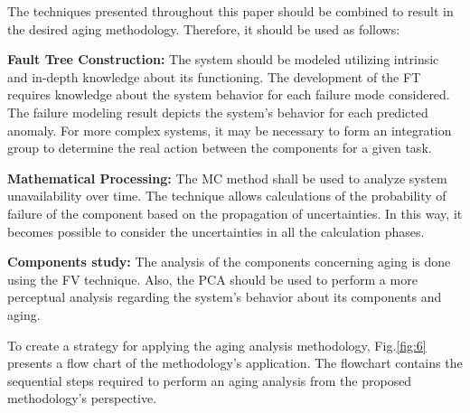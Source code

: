 \documentclass{ws-m3as}
\begin{document}
The techniques presented throughout this paper should be combined to result in the desired aging methodology. Therefore, it should be used as follows:

\begin{romanlist}[(ii)]
	\item \textbf{Fault Tree Construction:}
	The system should be modeled utilizing intrinsic and in-depth knowledge about its functioning. The development of the FT requires knowledge about the system behavior for each failure mode considered. The failure modeling result depicts the system's behavior for each predicted anomaly. For more complex systems, it may be necessary to form an integration group to determine the real action between the components for a given task. 
	\item \textbf{Mathematical Processing:} The MC method shall be used to analyze system unavailability over time. The technique allows calculations of the probability of failure of the component based on the propagation of uncertainties. In this way, it becomes possible to consider the uncertainties in all the calculation phases.
	\item \textbf{Components study:} The analysis of the components concerning aging is done using the FV technique. Also, the PCA should be used to perform a more perceptual analysis regarding the system's behavior about its components and aging.
\end{romanlist}
 
To create a strategy for applying the aging analysis methodology, Fig.\ref{fig:6} presents a flow chart of the methodology's application. The flowchart contains the sequential steps required to perform an aging analysis from the proposed methodology's perspective.
\end{document}
